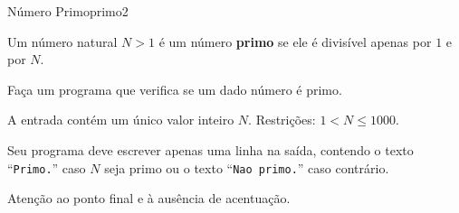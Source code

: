 \documentclass[12pt,a4paper,oneside]{article}
\begin{document}
\begin{problem}{Número Primo}{primo}{2}
 
Um número natural $N > 1$ é um número \textbf{primo} se ele é divisível apenas por $1$ e por $N$.

Faça um programa que verifica se um dado número é primo.

%

\InputFile

A entrada contém um único valor inteiro $N$. Restrições: $1 < N \leq 1000$.


\OutputFile

Seu programa deve escrever apenas uma linha na saída, contendo o texto ``\texttt{Primo.}'' caso $N$ seja primo ou o texto ``\texttt{Nao primo.}'' caso contrário.

Atenção ao ponto final e à ausência de acentuação.

\Example

\begin{example}
%
\end{example}

\begin{example}
%
\end{example}



\end{problem}
\end{document}
